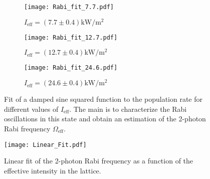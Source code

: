 \begin{figure}[!htbp]
	\centering
	\begin{subfigure}{1.\textwidth}
		\centering
		\label{fig:fig:Bragg_fit_1st_order_7.7}
		\texttt{[image: Rabi\_fit\_7.7.pdf]}
		\caption{$I_\text{eff} = (7.7\pm 0.4)\si{\kilo\watt\per\meter\squared}$}
	\end{subfigure}%
	\hfill
	\begin{subfigure}{1.\textwidth}
		\centering
		\label{fig:Bragg_fit_1st_order_12.7}
		\texttt{[image: Rabi\_fit\_12.7.pdf]}
		\caption{$I_\text{eff} = (12.7\pm 0.4)\si{\kilo\watt\per\meter\squared}$}
	\end{subfigure}
	\hfill
	\begin{subfigure}{1.\textwidth}
		\centering
		\label{fig:Bragg_fit_1st_order_24.6}
		\texttt{[image: Rabi\_fit\_24.6.pdf]}
		\caption{$I_\text{eff} = (24.6\pm 0.4)\si{\kilo\watt\per\meter\squared}$}
	\end{subfigure}
	\caption[Fit of a damped sine squared function to the population rate for different values of $I_\text{eff}$]{Fit of a damped sine squared function to the population rate for different values of $I_\text{eff}$. The main is to characterize the Rabi oscillations in this state and obtain an estimation of the 2-photon Rabi frequency $\Omega_\text{eff}$.}
	\label{fig:Bragg_fit_1st_order}
\end{figure}

\begin{figure}[!htbp]\centering
	\texttt{[image: Linear\_Fit.pdf]}
	\caption[Linear fit of the 2-photon Rabi frequency as a function of the effective intensity in the lattice]{Linear fit of the 2-photon Rabi frequency as a function of the effective intensity in the lattice.}\label{fig:Linear_fit}
\end{figure}

\newpage

